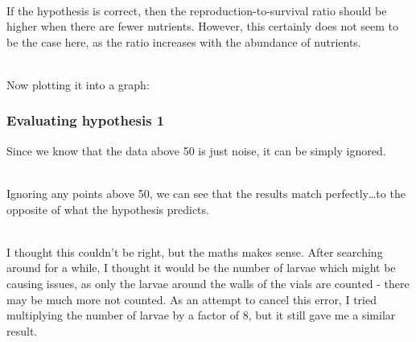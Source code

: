 \documentclass{article}
\begin{document}
\noindent\\
If the hypothesis is correct, then the reproduction-to-survival ratio should be higher when there are fewer nutrients. However, this certainly does not seem to be the case here, as the ratio increases with the abundance of nutrients.

\noindent\\
Now plotting it into a graph:

\begin{center}
\end{center}

\newpage
\subsubsection{Evaluating hypothesis 1}
Since we know that the data above 50 is just noise, it can be simply ignored.

\noindent\\
Ignoring any points above 50, we can see that the results match perfectly\dots\space to the opposite of what the hypothesis predicts.

\noindent\\
I thought this couldn't be right, but the maths makes sense. After searching around for a while, I thought it would be the number of larvae which might be causing issues, as only the larvae around the walls of the vials are counted - there may be much more not counted. As an attempt to cancel this error, I tried multiplying the number of larvae by a factor of 8, but it still gave me a similar result.
\end{document}
